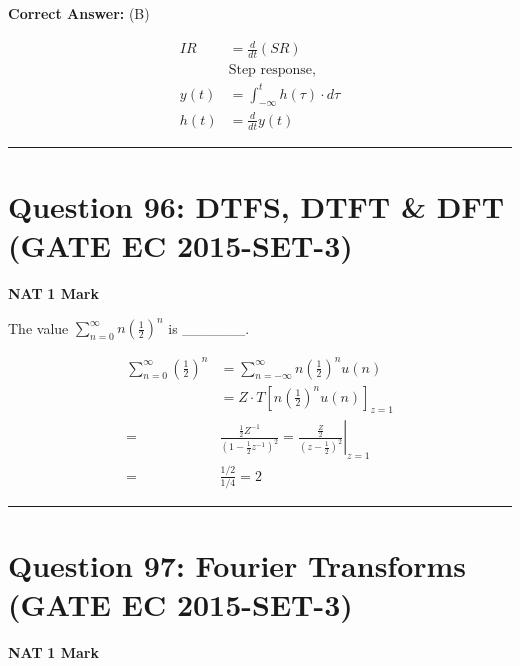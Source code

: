 \documentclass[11pt,a4paper]{article}
\begin{document}
\noindent \textbf{Correct Answer:} (B)

\begin{tcolorbox}[solbox, title=Detailed Solution -- Question 95]
\[
\begin{aligned} IR&= \frac{d}{dt}(SR)\\ &\text{Step response,} \\ y(t)&=\int_{-\infty }^{t}h(\tau )\cdot d\tau \\ h(t)&= \frac{d}{dt}y(t) \end{aligned}
\]
\end{tcolorbox}

\vspace{1.5em}
\hrule
\vspace{1.5em}

\section*{Question 96: DTFS, DTFT \& DFT (GATE EC 2015-SET-3)}
\noindent \textbf{\color{primary}NAT} \hfill \textbf{\color{secondary}1 Mark}


\noindent The value $\sum_{n=0}^{\infty }n(\frac{1}{2})^{n}$ is \_\_\_\_\_\_.


\begin{tcolorbox}[solbox, title=Detailed Solution -- Question 96]
\[
\begin{aligned} \sum_{n=0}^{\infty}\left(\frac{1}{2}\right)^{n} &=\sum_{n=-\infty}^{\infty} n\left(\frac{1}{2}\right)^{n} u(n) \\ &=Z \cdot T\left[n\left(\frac{1}{2}\right)^{n} u(n)\right]_{z=1} \\ =& \frac{\frac{1}{2} Z^{-1}}{\left(1-\frac{1}{2} z^{-1}\right)^{2}}=\left.\frac{\frac{Z}{2}}{\left(z-\frac{1}{2}\right)^{2}}\right|_{z=1} \\ =& \frac{1 / 2}{1 / 4}=2 \end{aligned}
\]
\end{tcolorbox}

\vspace{1.5em}
\hrule
\vspace{1.5em}

\section*{Question 97: Fourier Transforms (GATE EC 2015-SET-3)}
\noindent \textbf{\color{primary}NAT} \hfill \textbf{\color{secondary}1 Mark}
\end{document}
